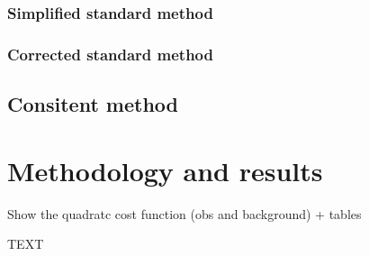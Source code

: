 \documentclass[npg, manuscript]{copernicus}
\begin{document}
\subsubsection{Simplified standard method}

\subsubsection{Corrected standard method}

\subsection{Consitent method}

\section{Methodology and results}
Show the quadratc cost function (obs and background) + tables



\conclusions  %
TEXT












\appendix
\end{document}
